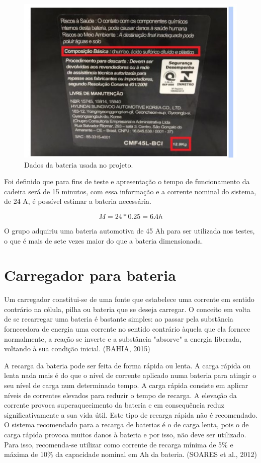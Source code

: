 \begin{figure}[h!]
  \centering
  \includegraphics{figuras/Bateria2.jpg}
  \caption{Dados da bateria usada no projeto.}
\end{figure}

Foi definido que para fins de teste e apresentação o tempo de funcionamento da cadeira será de 15 minutos, com essa informação e a corrente nominal do sistema, de 24 A, é possível estimar a bateria necessária. 

\[M = 24*0.25 = 6 Ah\]

O grupo adquiriu uma bateria automotiva de 45 Ah para ser utilizada nos testes, o que é mais de sete vezes maior do que a bateria dimensionada.

\section{Carregador para bateria}

 Um carregador constitui-se de uma fonte que estabelece uma corrente em sentido contrário na célula, pilha ou bateria que se deseja carregar. O conceito em volta de se recarregar uma bateria é bastante simples: ao passar pela substância fornecedora de energia uma corrente no sentido contrário àquela que ela fornece normalmente, a reação se inverte e a substância "absorve" a energia liberada, voltando à sua condição inicial. (BAHIA, 2015)

A recarga da bateria pode ser feita de forma rápida ou lenta. A carga rápida ou lenta nada mais é do que o nível de corrente aplicado numa bateria para atingir o seu nível de carga num determinado tempo. A carga rápida consiste em aplicar níveis de correntes elevados para reduzir o tempo de recarga. A elevação da corrente provoca superaquecimento da bateria e em consequência reduz significativamente a sua vida útil. Este tipo de recarga rápida não é recomendado. O sistema recomendado para a recarga de baterias é o de carga lenta, pois o de carga rápida provoca muitos danos à bateria e por isso, não deve ser utilizado. Para isso, recomenda-se utilizar como corrente de recarga mínima de 5\% e máxima de 10\% da capacidade nominal em Ah da bateria. (SOARES et al., 2012)


